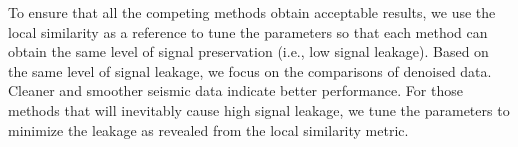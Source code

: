 To ensure that all the competing methods obtain acceptable results, we use the local similarity as a reference to tune the parameters so that each method can obtain the same level of signal preservation (i.e., low signal leakage). Based on the same level of signal leakage, we focus on the comparisons of denoised data. Cleaner and smoother seismic data indicate better performance. For those methods that will inevitably cause high signal leakage, we tune the parameters to minimize the leakage as revealed from the local similarity metric. 
 
